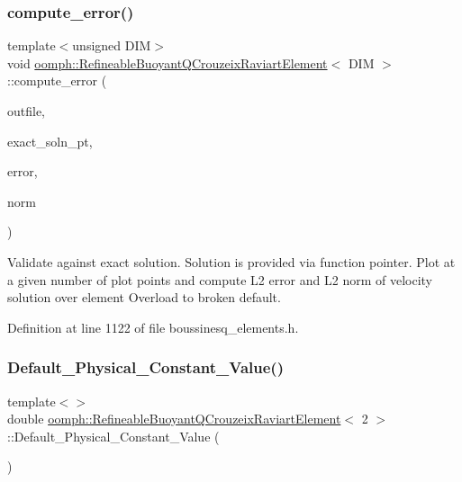 \subsubsection{\texorpdfstring{compute\+\_\+error()}{compute\_error()}\hspace{0.1cm}{\footnotesize\ttfamily [2/2]}}
{\footnotesize\ttfamily template$<$unsigned D\+IM$>$ \\
void \hyperlink{classoomph_1_1RefineableBuoyantQCrouzeixRaviartElement}{oomph\+::\+Refineable\+Buoyant\+Q\+Crouzeix\+Raviart\+Element}$<$ D\+IM $>$\+::compute\+\_\+error (\begin{DoxyParamCaption}\item[{std\+::ostream \&}]{outfile,  }\item[{Finite\+Element\+::\+Steady\+Exact\+Solution\+Fct\+Pt}]{exact\+\_\+soln\+\_\+pt,  }\item[{double \&}]{error,  }\item[{double \&}]{norm }\end{DoxyParamCaption})\hspace{0.3cm}{\ttfamily [inline]}}



Validate against exact solution. Solution is provided via function pointer. Plot at a given number of plot points and compute L2 error and L2 norm of velocity solution over element Overload to broken default. 



Definition at line 1122 of file boussinesq\+\_\+elements.\+h.

\mbox{\label{classoomph_1_1RefineableBuoyantQCrouzeixRaviartElement_ab36052eddfa043777414ce64470bb0a3}} 
\subsubsection{\texorpdfstring{Default\+\_\+\+Physical\+\_\+\+Constant\+\_\+\+Value()}{Default\_Physical\_Constant\_Value()}\hspace{0.1cm}{\footnotesize\ttfamily [1/2]}}
{\footnotesize\ttfamily template$<$$>$ \\
double \hyperlink{classoomph_1_1RefineableBuoyantQCrouzeixRaviartElement}{oomph\+::\+Refineable\+Buoyant\+Q\+Crouzeix\+Raviart\+Element}$<$ 2 $>$\+::Default\+\_\+\+Physical\+\_\+\+Constant\+\_\+\+Value (\begin{DoxyParamCaption}{ }\end{DoxyParamCaption})\hspace{0.3cm}{\ttfamily [private]}}



